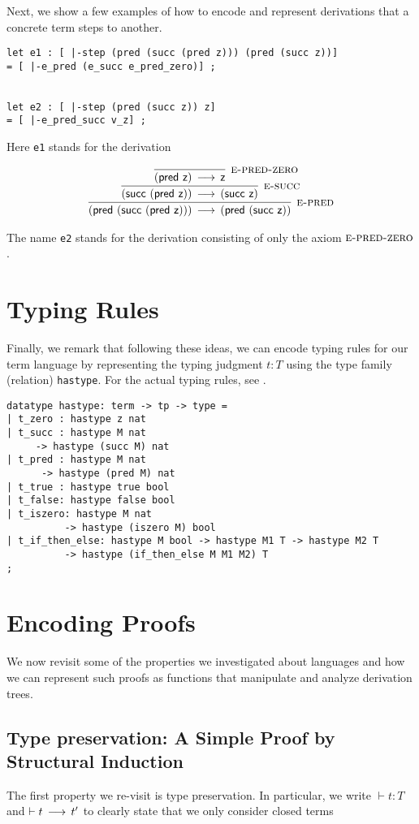 Next, we show a few examples of how to encode and represent
derivations that a concrete term steps to another.

\begin{lstlisting}
let e1 : [ |-step (pred (succ (pred z))) (pred (succ z))]
= [ |-e_pred (e_succ e_pred_zero)] ;


let e2 : [ |-step (pred (succ z)) z]
= [ |-e_pred_succ v_z] ;
\end{lstlisting}


Here \lstinline!e1! stands for the derivation


\[
\begin{array}{c}
\infer[\SPRED]{(\tmpred {(\tmsucc {(\tmpred {\tmzero})})}) \steps (\tmpred {(\tmsucc {\tmzero})})}
{\infer[\SSUC]{(\tmsucc {(\tmpred {\tmzero})}) \steps (\tmsucc {\tmzero} )}
 {\infer[\SPREDZ]{(\tmpred {\tmzero}) \steps \tmzero}{}}
}
\end{array}
\]

The name \lstinline!e2! stands for the derivation consisting of only
the axiom $\textsc{e-pred-zero}$.

\section{Typing Rules}
Finally, we remark that following these ideas, we can encode typing rules for
our term language by representing the typing judgment $t : T$ using the type
family (relation) \lstinline!hastype!. For the actual typing rules,
see \cite[Ch ?, Fig. ?]{TAPL}.


\begin{lstlisting}
datatype hastype: term -> tp -> type =
| t_zero : hastype z nat
| t_succ : hastype M nat
     -> hastype (succ M) nat
| t_pred : hastype M nat
      -> hastype (pred M) nat
| t_true : hastype true bool
| t_false: hastype false bool
| t_iszero: hastype M nat
          -> hastype (iszero M) bool
| t_if_then_else: hastype M bool -> hastype M1 T -> hastype M2 T
          -> hastype (if_then_else M M1 M2) T
;
\end{lstlisting}



\section{Encoding Proofs}
We now revisit some of the properties we investigated about languages
and how we can represent such proofs as functions that manipulate and
analyze derivation trees.

\subsection{Type preservation: A Simple Proof by Structural Induction} The first property we re-visit is type
preservation. In particular, we write $\vdash t : T$ and $\vdash t
\mathrel{\,\longrightarrow\,} t'$ to clearly state that we only consider closed terms

